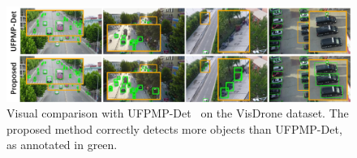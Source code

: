 \documentclass[letterpaper]{article} %
\newcommand\red[1]{\textcolor{red}{#1}}
\newcommand\blue[1]{\textcolor{blue}{#1}}
\newcommand\rjf[1]{\textcolor{red}{\{RJF: #1\}}}
\begin{document}
\begin{figure}[ht]
	\centering
	\includegraphics[width=1\linewidth]{images/visualization11.pdf}
	 \caption{Visual comparison with UFPMP-Det~\cite{Huang_2022_UFPMP} on the VisDrone dataset. %
 The proposed method correctly detects more objects than UFPMP-Det, as annotated in green. %
 }
 \label{fig: visualization}
\end{figure}
\end{document}
